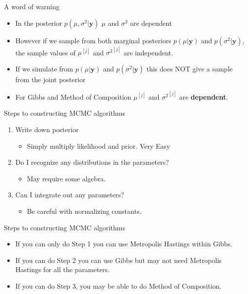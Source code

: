 \documentclass[10pt]{beamer}
\begin{document}
\begin{frame}{A word of warning}
  \begin{itemize}
  \item In the posterior $p(\mu,\sigma^2|{\bm y})$ $\mu$ and $\sigma^2$ are dependent

  \item However if we sample from both marginal posteriors $p(\mu|{\bm y})$ and $p(\sigma^2|{\bm y})$, the sample values of $\mu^{[j]}$ and ${\sigma^2}^{[j]}$ are independent.

  \item If we simulate from $p(\mu|{\bm y})$ and $p(\sigma^2|{\bm y})$ this does NOT give a sample from the joint posterior

  \item For Gibbs and Method of Composition $\mu^{[j]}$ and ${\sigma^2}^{[j]}$ are {\bf dependent}.
  \end{itemize}
\end{frame}
\begin{frame}{Steps to constructing MCMC algorithms}
  \begin{enumerate}
  \item Write down posterior

    \begin{itemize}
    \item Simply multiply likelihood and prior.  Very Easy
    \end{itemize}

  \item Do I recognize any distributions in the parameters?
    \begin{itemize}
    \item May require some algebra.
    \end{itemize}

  \item Can I integrate out any parameters?
    \begin{itemize}
    \item Be careful with normalizing constants.
    \end{itemize}
  \end{enumerate}
\end{frame}
\begin{frame}{Steps to constructing MCMC algorithms}
  \begin{itemize}
  \item If you can only do Step 1 you can use Metropolis Hastings within Gibbs.

  \item If you can do Step 2 you can use Gibbs but may not need Metropolis Hastings for all the parameters.

  \item If you can do Step 3, you may be able to do Method of Composition.
  \end{itemize}
\end{frame}
\end{document}
